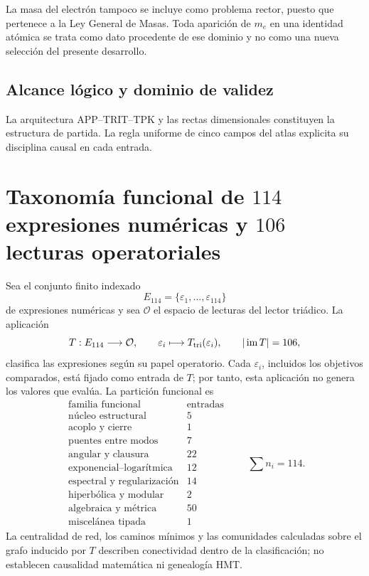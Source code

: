 La masa del electr\'on tampoco se incluye como problema rector, puesto que
pertenece a la Ley General de Masas. Toda aparici\'on de \(m_e\) en una
identidad at\'omica se trata como dato procedente de ese dominio y no como
una nueva selecci\'on del presente desarrollo.

\subsection*{Alcance lógico y dominio de validez}
La arquitectura APP--TRIT--TPK y las rectas dimensionales constituyen la
estructura de partida. La regla uniforme de cinco campos del atlas explicita
su disciplina causal en cada entrada.



\section{Taxonomía funcional de \(114\) expresiones numéricas y \(106\) lecturas operatoriales}
\label{p3-83-c23-s2:sec:atlas-taxonomico-114-constantes-rev11}

Sea el conjunto finito indexado
\[
 E_{114}=\{\varepsilon_1,\ldots,\varepsilon_{114}\}
\]
de expresiones numéricas y sea \(\mathcal O\) el espacio de lecturas del
lector triádico. La aplicación
\[
 T:E_{114}\longrightarrow\mathcal O,
 \qquad \varepsilon_i\longmapsto T_{\rm tri}(\varepsilon_i),
 \qquad |\operatorname{im}T|=106,
\]
clasifica las expresiones según su papel operatorio. Cada
\(\varepsilon_i\), incluidos los objetivos comparados, está fijado como
entrada de \(T\); por tanto, esta aplicación no genera los valores que
evalúa. La partición funcional es
\[
\begin{array}{l|r}
\text{familia funcional}&\text{entradas}\\ \hline
\text{núcleo estructural}&5\\
\text{acoplo y cierre}&1\\
\text{puentes entre modos}&7\\
\text{angular y clausura}&22\\
\text{exponencial--logarítmica}&12\\
\text{espectral y regularización}&14\\
\text{hiperbólica y modular}&2\\
\text{algebraica y métrica}&50\\
\text{miscelánea tipada}&1
\end{array}
\qquad
\sum n_i=114.
\]
La centralidad de red, los caminos mínimos y las comunidades calculadas sobre
el grafo inducido por \(T\) describen conectividad dentro de la clasificación;
no establecen causalidad matemática ni genealogía HMT.

